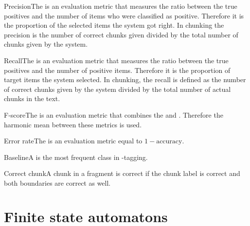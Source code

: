 \documentclass{article}
\begin{document}
\begin{df}{Precision}The \sb{} is an evaluation metric that measures the ratio between the true positives and the number of items who were classified as positive. Therefore it is the proportion of the selected items the system got right. In chunking the precision is the number of correct chunks given divided by the total number of chunks given by the system.
\end{df}
\begin{df}{Recall}The \sb{} is an evaluation metric that measures the ratio between the true positives and the number of positive items. Therefore it is the proportion of target items the system selected. In chunking, the recall is defined as the number of correct chunks given by the system divided by the total number of actual chunks in the text.
\end{df}
\begin{df}{F-score}The \sb{} is an evaluation metric that combines the  and . Therefore the harmonic mean between these metrics is used.
\end{df}
\begin{df}{Error rate}The \sb{} is an evaluation metric equal to $1-\mbox{accuracy}$.
\end{df}
\begin{df}{Baseline}A \sb{} is the most frequent class in \pos{}-tagging.
\end{df}
\begin{df}{Correct chunk}A chunk in a fragment is correct if the chunk label is correct and both boundaries are correct as well.
\end{df}
\section{Finite state automatons}
\printindex
\end{document}
